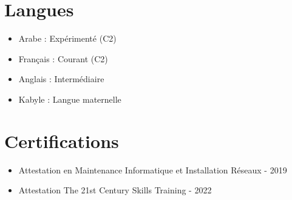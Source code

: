 \documentclass[a4paper,10pt]{article}
\begin{document}
\section*{Langues}
\begin{itemize}[leftmargin=*]
    \item Arabe : Expérimenté (C2)
    \item Français : Courant (C2)
    \item Anglais : Intermédiaire
    \item Kabyle : Langue maternelle
\end{itemize}

\section*{Certifications}
\begin{itemize}[leftmargin=*]
    \item Attestation en Maintenance Informatique et Installation Réseaux - 2019
    \item Attestation The 21st Century Skills Training - 2022
\end{itemize}
\end{document}
